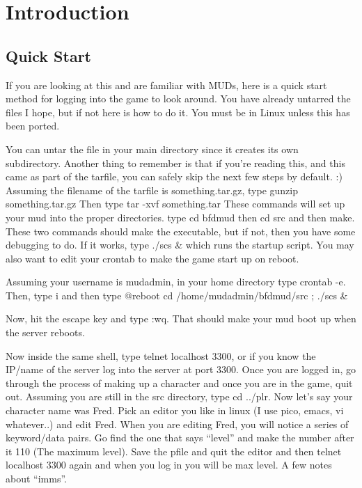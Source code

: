 \chapter{Introduction}

\section{Quick Start}

If you are looking at this and are familiar with MUDs, here is a quick
start method for logging into the game to look around. You have
already untarred the files I hope, but if not here is how to do
it. You must be in Linux unless this has been ported.

You can untar the file in your main directory since it creates its own
subdirectory. Another thing to remember is that if you're reading
this, and this came as part of the tarfile, you can safely skip the
next few steps by default. :) Assuming the filename of the tarfile is
something.tar.gz, type gunzip something.tar.gz Then type tar -xvf
something.tar These commands will set up your mud into the proper
directories. type cd bfdmud then cd src and then make. These two
commands should make the executable, but if not, then you have some
debugging to do. If it works, type ./scs \& which runs the startup
script. You may also want to edit your crontab to make the game start
up on reboot.

Assuming your username is mudadmin, in your home directory type
crontab -e.  Then, type i and then type
\vv
@reboot cd /home/mudadmin/bfdmud/src ; ./scs \&
\vv

Now, hit the escape key and type :wq. That should make your mud boot
up when the server reboots.

Now inside the same shell, type telnet localhost 3300, or if you know
the IP/name of the server log into the server at port 3300.  Once you
are logged in, go through the process of making up a character and
once you are in the game, quit out. Assuming you are still in the src
directory, type cd ../plr. Now let's say your character name was
Fred. Pick an editor you like in linux (I use pico, emacs, vi
whatever..) and edit Fred. When you are editing Fred, you will notice
a series of keyword/data pairs. Go find the one that says ``level''
and make the number after it 110 (The maximum level). Save the pfile
and quit the editor and then telnet localhost 3300 again and when you
log in you will be max level. A few notes about ``imms''.

